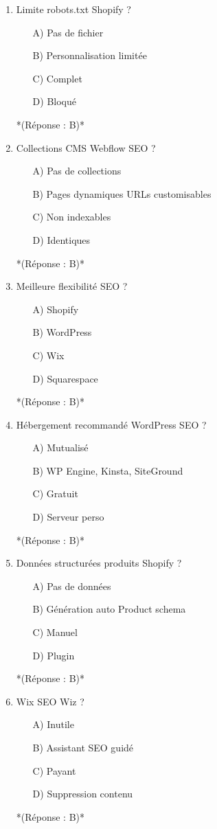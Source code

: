 \documentclass[12pt,a4paper,twoside]{report}
\begin{document}
\begin{enumerate}
\item Limite robots.txt Shopify ?
\begin{itemize}
\item[A)] Pas de fichier
\item[B)] Personnalisation limitée
\item[C)] Complet
\item[D)] Bloqué
\end{itemize}
*(Réponse : B)*

\item Collections CMS Webflow SEO ?
\begin{itemize}
\item[A)] Pas de collections
\item[B)] Pages dynamiques URLs customisables
\item[C)] Non indexables
\item[D)] Identiques
\end{itemize}
*(Réponse : B)*

\item Meilleure flexibilité SEO ?
\begin{itemize}
\item[A)] Shopify
\item[B)] WordPress
\item[C)] Wix
\item[D)] Squarespace
\end{itemize}
*(Réponse : B)*

\item Hébergement recommandé WordPress SEO ?
\begin{itemize}
\item[A)] Mutualisé
\item[B)] WP Engine, Kinsta, SiteGround
\item[C)] Gratuit
\item[D)] Serveur perso
\end{itemize}
*(Réponse : B)*

\item Données structurées produits Shopify ?
\begin{itemize}
\item[A)] Pas de données
\item[B)] Génération auto Product schema
\item[C)] Manuel
\item[D)] Plugin
\end{itemize}
*(Réponse : B)*

\item Wix SEO Wiz ?
\begin{itemize}
\item[A)] Inutile
\item[B)] Assistant SEO guidé
\item[C)] Payant
\item[D)] Suppression contenu
\end{itemize}
*(Réponse : B)*


\end{enumerate}
\end{document}
